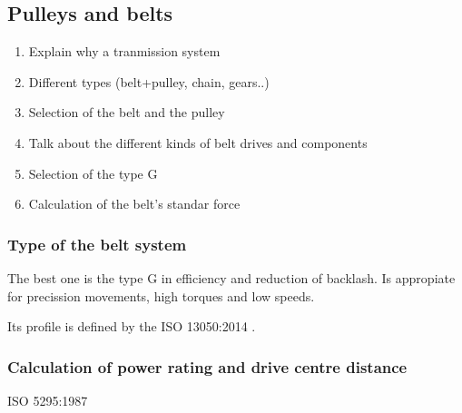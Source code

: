 \subsection{Pulleys and belts} %
\label{sub:pulleys_and_belts}

  \begin{enumerate}
    \item Explain why a tranmission system
    \item Different types (belt+pulley, chain, gears..)
    \item Selection of the belt and the pulley
      \item Talk about the different kinds of belt drives and components
      \item Selection of the type G
      \item Calculation of the belt's standar force
  \end{enumerate}

  
  \subsubsection{Type of the belt system}  %
  \label{ssub:type_of_the_belt_system}
  

  The best one is the type G in efficiency and reduction of backlash.
  Is appropiate for precission movements, high torques and low speeds.

  Its profile is defined by the ISO 13050:2014 \cite{ISO13050}.


  \subsubsection{Calculation of power rating and drive centre distance} %
  \label{ssub:calculation_of_power_rating_and_drive_centre_distance}
  ISO 5295:1987 \cite{ISO5295}
  

